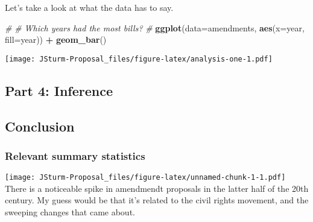 \documentclass[]{article}
\newenvironment{Shaded}{\begin{snugshade}}{\end{snugshade}}
\newcommand{\KeywordTok}[1]{\textcolor[rgb]{0.13,0.29,0.53}{\textbf{#1}}}
\newcommand{\DataTypeTok}[1]{\textcolor[rgb]{0.13,0.29,0.53}{#1}}
\newcommand{\DecValTok}[1]{\textcolor[rgb]{0.00,0.00,0.81}{#1}}
\newcommand{\StringTok}[1]{\textcolor[rgb]{0.31,0.60,0.02}{#1}}
\newcommand{\CommentTok}[1]{\textcolor[rgb]{0.56,0.35,0.01}{\textit{#1}}}
\newcommand{\OperatorTok}[1]{\textcolor[rgb]{0.81,0.36,0.00}{\textbf{#1}}}
\newcommand{\NormalTok}[1]{#1}
\begin{document}
Let's take a look at what the data has to say.

\begin{Shaded}
\begin{Highlighting}[]
\CommentTok{#}
\CommentTok{# Which years had the most bills?}
\CommentTok{#}
\KeywordTok{ggplot}\NormalTok{(}\DataTypeTok{data=}\NormalTok{amendments, }\KeywordTok{aes}\NormalTok{(}\DataTypeTok{x=}\NormalTok{year, }\DataTypeTok{fill=}\NormalTok{year)) }\OperatorTok{+}
\StringTok{  }\KeywordTok{geom_bar}\NormalTok{()}
\end{Highlighting}
\end{Shaded}

\texttt{[image: JSturm-Proposal\_files/figure-latex/analysis-one-1.pdf]}

\subsection{Part 4: Inference}\label{part-4-inference}

\subsection{Conclusion}\label{conclusion}

\subsubsection{Relevant summary
statistics}\label{relevant-summary-statistics}

\begin{Shaded}
\end{Shaded}

\texttt{[image: JSturm-Proposal\_files/figure-latex/unnamed-chunk-1-1.pdf]}
There is a noticeable spike in amendmendt proposals in the latter half
of the 20th century. My guess would be that it's related to the civil
rights movement, and the sweeping changes that came about.
\end{document}
